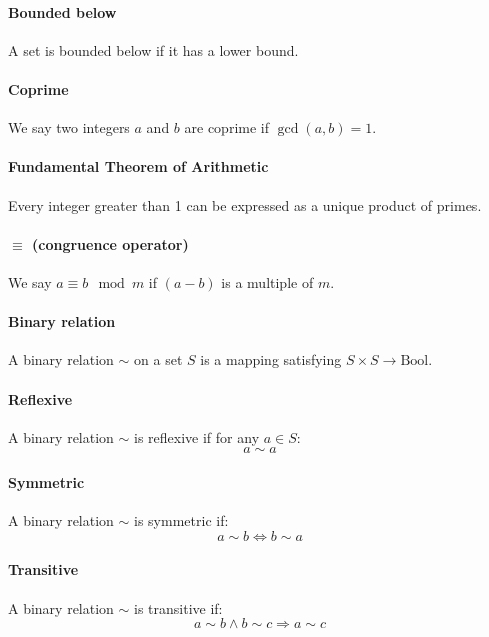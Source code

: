 \documentclass{scrartcl}
\begin{document}
\paragraph{Bounded below}
A set is bounded below if it has a lower bound.

\paragraph{Coprime}
We say two integers $ a $ and $ b $ are coprime if $ \gcd(a, b) = 1 $.

\paragraph{Fundamental Theorem of Arithmetic}
Every integer greater than 1 can be expressed as a unique product of primes.

\paragraph{$ \equiv$ (congruence operator)}
We say $ a \equiv b \mod m $ if $ (a - b) $ is a multiple of $ m $.

\paragraph{Binary relation}
A binary relation $ \sim $ on a set $ S $ is a mapping satisfying $ S \times S \to \textrm{Bool} $.

\paragraph{Reflexive}
A binary relation $ \sim $ is reflexive if for any $ a \in S $:
\begin{equation}
a \sim a
\end{equation}

\paragraph{Symmetric}
A binary relation $ \sim $ is symmetric if:
\begin{equation}
a \sim b \Leftrightarrow b \sim a
\end{equation}

\paragraph{Transitive}
A binary relation $ \sim $ is transitive if:
\begin{equation}
a \sim b \land b \sim c \Rightarrow a \sim c
\end{equation}
\end{document}
